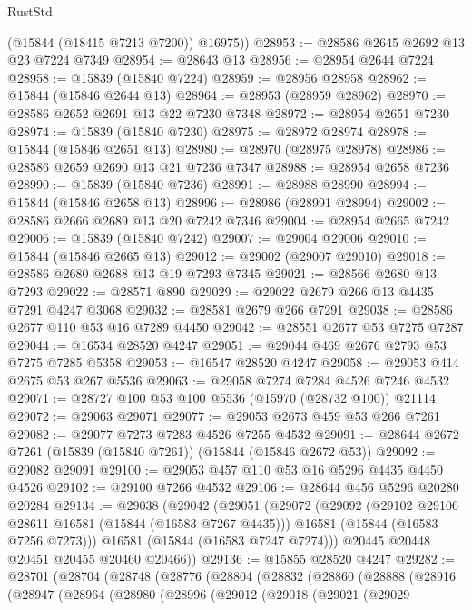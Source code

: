 \begin{lexlean}{RustStd}
\begin{coremodule}
        (@15844 (@18415 @7213 @7200))
        @16975))
@28953 := @28586 @2645 @2692 @13 @23 @7224 @7349
@28954 := @28643 @13
@28956 := @28954 @2644 @7224
@28958 := @15839 (@15840 @7224)
@28959 := @28956 @28958
@28962 := @15844 (@15846 @2644 @13)
@28964 := @28953 (@28959 @28962)
@28970 := @28586 @2652 @2691 @13 @22 @7230 @7348
@28972 := @28954 @2651 @7230
@28974 := @15839 (@15840 @7230)
@28975 := @28972 @28974
@28978 := @15844 (@15846 @2651 @13)
@28980 := @28970 (@28975 @28978)
@28986 := @28586 @2659 @2690 @13 @21 @7236 @7347
@28988 := @28954 @2658 @7236
@28990 := @15839 (@15840 @7236)
@28991 := @28988 @28990
@28994 := @15844 (@15846 @2658 @13)
@28996 := @28986 (@28991 @28994)
@29002 := @28586 @2666 @2689 @13 @20 @7242 @7346
@29004 := @28954 @2665 @7242
@29006 := @15839 (@15840 @7242)
@29007 := @29004 @29006
@29010 := @15844 (@15846 @2665 @13)
@29012 := @29002 (@29007 @29010)
@29018 := @28586 @2680 @2688 @13 @19 @7293 @7345
@29021 := @28566 @2680 @13 @7293
@29022 := @28571 @890
@29029 := @29022 @2679 @266 @13 @4435 @7291 @4247 @3068
@29032 := @28581 @2679 @266 @7291
@29038 := @28586 @2677 @110 @53 @16 @7289 @4450
@29042 := @28551 @2677 @53 @7275 @7287
@29044 := @16534 @28520 @4247
@29051 := @29044 @469 @2676 @2793 @53 @7275 @7285 @5358
@29053 := @16547 @28520 @4247
@29058 := @29053 @414 @2675 @53 @267 @5536
@29063 := @29058 @7274 @7284 @4526 @7246 @4532
@29071 := @28727 @100 @53 @100 @5536 (@15970 (@28732 @100)) @21114
@29072 := @29063 @29071
@29077 := @29053 @2673 @459 @53 @266 @7261
@29082 := @29077 @7273 @7283 @4526 @7255 @4532
@29091 := @28644 @2672 @7261 (@15839 (@15840 @7261)) (@15844 (@15846 @2672 @53))
@29092 := @29082 @29091
@29100 := @29053 @457 @110 @53 @16 @5296 @4435 @4450 @4526
@29102 := @29100 @7266 @4532
@29106 := @28644 @456 @5296 @20280 @20284
@29134 := @29038
    (@29042
      (@29051
        (@29072
          (@29092
            (@29102 @29106 @28611 @16581 (@15844 (@16583 @7267 @4435)))
            @16581
            (@15844 (@16583 @7256 @7273)))
          @16581
          (@15844 (@16583 @7247 @7274)))
        @20445
        @20448
        @20451
        @20455
        @20460
        @20466))
@29136 := @15855 @28520 @4247
@29282 := @28701
    (@28704
      (@28748
        (@28776
          (@28804
            (@28832
              (@28860
                (@28888
                  (@28916
                    (@28947
                      (@28964
                        (@28980
                          (@28996
                            (@29012
                              (@29018
                                (@29021
                                  (@29029

\end{coremodule}
\end{lexlean}
